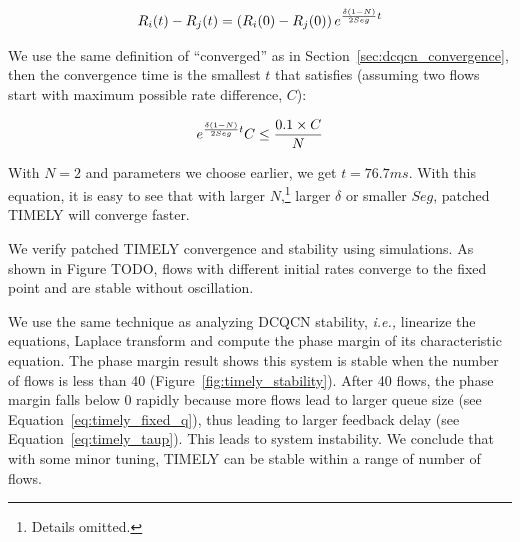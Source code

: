 \begin{equation}
\small
{R_i}(t) - {R_j}(t) = \left( {{R_i}(0) - {R_j}(0)} \right){e^{\frac{{\delta (1 - N)}}{{2Seg}}t}}
\end{equation}

We use the same definition of ``converged'' as in Section~\ref{sec:dcqcn_convergence}, then the convergence
time is the smallest $t$ that satisfies (assuming two flows start with maximum possible rate difference, $C$):

\begin{equation}
\small
{e^{\frac{{\delta (1 - N)}}{{2Seg}}t}}C \le \frac{{0.1 \times C}}{N}
\end{equation}

With $N=2$ and parameters we choose earlier, we get $t = 76.7ms$. With this equation, it is easy to see that
with larger $N$,\footnote{Details omitted.} larger $\delta$ or smaller $Seg$, patched TIMELY will converge faster.

We verify patched TIMELY convergence and stability using simulations. As shown in Figure TODO, flows with different 
initial rates converge to the fixed point and are stable without oscillation. 

 We use the same technique as analyzing
DCQCN stability, {\em i.e.,} linearize the equations, Laplace transform and compute the phase margin 
of its characteristic equation. The phase margin result shows this system is stable when the number of 
flows is less than 40 (Figure~\ref{fig:timely_stability}). After 40 flows, the phase margin falls below 
0 rapidly because more flows lead to larger queue size (see Equation~\ref{eq:timely_fixed_q}), 
thus leading to larger feedback delay (see Equation~\ref{eq:timely_taup}). 
This leads to system instability. We conclude that with some minor tuning, TIMELY can be stable 
within a range of number of flows.